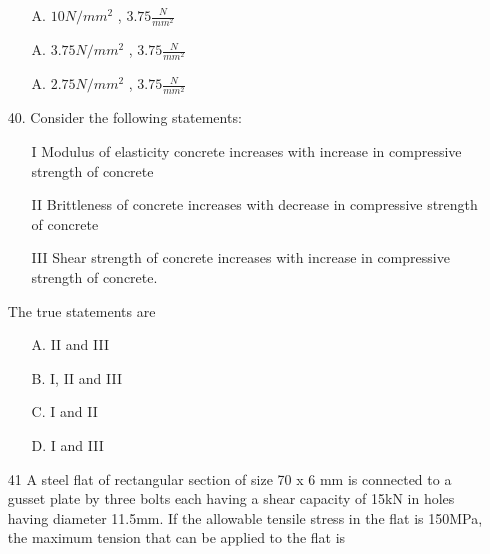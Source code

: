 \documentclass[journal]{IEEEtran}
\begin{document}
\begin{enumerate}
\begin{enumerate}
    \item [A.] $10N/mm^2$ , $3.75\frac{N}{mm^2}$
    \item [A.] $3.75N/mm^2$ , $3.75\frac{N}{mm^2}$ 
    \item [A.] $2.75N/mm^2$ , $3.75\frac{N}{mm^2}$ 
  \end{enumerate}
  \item[40.] Consider the following statements: 
  \begin{enumerate}
    \item [I] Modulus of elasticity concrete increases with increase in compressive
    strength of concrete
    \item [II] Brittleness of concrete increases with decrease in compressive strength of
    concrete
    \item [III] Shear strength of concrete increases with increase in compressive strength
    of concrete. 
  \end{enumerate}
  The true statements are 
  \begin{enumerate}
    \item [A.] II and III
    \item [B.] I, II and III
    \item [C.] I and II
    \item [D.] I and III
  \end{enumerate}
  \item[41]  A steel flat of rectangular section of size 70 x 6 mm is connected to a gusset plate
  by three bolts each having a shear capacity of 15kN in holes having diameter
  11.5mm. If the allowable tensile stress in the flat is 150MPa, the maximum
  tension that can be applied to the flat is
  \begin{figure}[!ht]
    \centering
\end{figure}
\end{enumerate}
\end{document}
